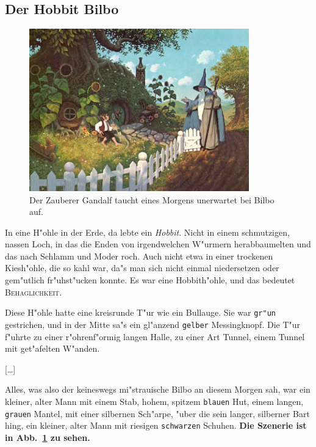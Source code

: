 \documentclass[a4paper]{article}
\begin{document}
\subsection{Der Hobbit Bilbo}
%
\begin{figure}[h]
\centering
%
\includegraphics[width=0.85\textwidth]{besuch}
\caption[Unerwarteter Besuch bei Bilbo]{Der Zauberer Gandalf taucht eines
Morgens unerwartet bei Bilbo auf.}
\label{fig:besuch}
\end{figure}
In eine H"ohle in der Erde, da lebte ein \emph{Hobbit}. Nicht in einem 
schmutzigen, nassen Loch, in das die Enden von irgendwelchen W"urmern 
herabbaumelten und das nach Schlamm und Moder roch. Auch nicht etwa in einer 
trockenen Kiesh"ohle, die so kahl war, da"s man sich nicht einmal niedersetzen
oder gem"utlich fr"uhst"ucken konnte. Es war eine Hobbith"ohle, und das
bedeutet \textsc{Behaglichkeit.}

Diese H"ohle hatte eine kreisrunde T"ur wie ein Bullauge. Sie war 
\texttt{gr"un} gestrichen, und in der Mitte sa"s ein gl"anzend \texttt{gelber}
Messingknopf. Die T"ur f"uhrte zu einer r"ohrenf"ormig langen Halle, zu einer 
Art Tunnel, einem Tunnel mit get"afelten W"anden.

[\dots]

Alles, was also der keineswegs mi"strauische Bilbo an diesem Morgen sah, war 
ein kleiner, alter Mann mit einem Stab, hohem, spitzem \texttt{blauen} Hut, 
einem langen, \texttt{grauen} Mantel, mit einer silbernen Sch"arpe, "uber die 
sein langer, silberner Bart hing, ein kleiner, alter Mann mit riesigen 
\texttt{schwarzen} Schuhen. \textbf{Die Szenerie ist in 
Abb.~\ref{fig:besuch} zu sehen.}
\end{document}
